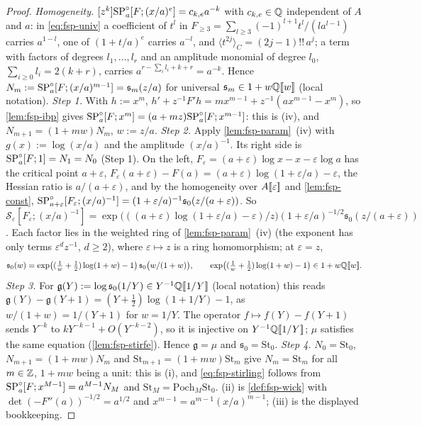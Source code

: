 \begin{proof}
\emph{Homogeneity.} $[z^k]\mathrm{SP}^{\circ}_a[F;(x/a)^e]=c_{k,e}a^{-k}$ with $c_{k,e}\in\mathbb{Q}$ independent of $A$ and $a$: in \eqref{eq:fsp-univ} a coefficient of $t^l$ in $F_{\geq3}=\sum_{l\geq3}(-1)^{l+1}t^l/(la^{l-1})$ carries $a^{1-l}$, one of $(1+t/a)^e$ carries $a^{-l}$, and $\langle t^{2j}\rangle_C=(2j-1)!!\,a^j$; a term with factors of degrees $l_1,\dots,l_r$ and an amplitude monomial of degree $l_0$, $\sum_{i\geq0}l_i=2(k+r)$, carries $a^{r-\sum_il_i+k+r}=a^{-k}$. Hence $N_m:=\mathrm{SP}^{\circ}_a[F;(x/a)^{m-1}]=\mathfrak s_m(z/a)$ for universal $\mathfrak s_m\in1+w\mathbb{Q}[\![ w ]\!]$ (local notation).
\emph{Step 1.} With $h:=x^m$, $h'+z^{-1}F'h=mx^{m-1}+z^{-1}(ax^{m-1}-x^m)$, so \cref{lem:fsp-ibp} gives $\mathrm{SP}^{\circ}_a[F;x^m]=(a+mz)\mathrm{SP}^{\circ}_a[F;x^{m-1}]$: this is (iv), and $N_{m+1}=(1+mw)N_m$, $w:=z/a$.
\emph{Step 2.} Apply \cref{lem:fsp-param}~(iv) with $g(x):=\log(x/a)$ and the amplitude $(x/a)^{-1}$. Its right side is $\mathrm{SP}^{\circ}_a[F;1]=N_1=N_0$ (Step 1). On the left, $F_\varepsilon=(a+\varepsilon)\log x-x-\varepsilon\log a$ has the critical point $a+\varepsilon$, $F_\varepsilon(a+\varepsilon)-F(a)=(a+\varepsilon)\log(1+\varepsilon/a)-\varepsilon$, the Hessian ratio is $a/(a+\varepsilon)$, and by the homogeneity over $A[\![ \varepsilon ]\!]$ and \cref{lem:fsp-const}, $\mathrm{SP}^{\circ}_{a+\varepsilon}[F_\varepsilon;(x/a)^{-1}]=(1+\varepsilon/a)^{-1}\mathfrak s_0(z/(a+\varepsilon))$. So
$\mathcal S_\varepsilon[F_\varepsilon;(x/a)^{-1}]=\exp\bigl(((a+\varepsilon)\log(1+\varepsilon/a)-\varepsilon)/z\bigr)(1+\varepsilon/a)^{-1/2}\mathfrak s_0(z/(a+\varepsilon))$. Each factor lies in the weighted ring of \cref{lem:fsp-param}~(iv) (the exponent has only terms $\varepsilon^dz^{-1}$, $d\geq2$), where $\varepsilon\mapsto z$ is a ring homomorphism; at $\varepsilon=z$,
\[
\mathfrak s_0(w)=\exp\bigl((\tfrac1w+\tfrac12)\log(1+w)-1\bigr)\,\mathfrak s_0\bigl(w/(1+w)\bigr),\qquad\exp\bigl((\tfrac1w+\tfrac12)\log(1+w)-1\bigr)\in1+w\mathbb{Q}[\![ w ]\!].
\]
\emph{Step 3.} For $\mathfrak g(Y):=\log\mathfrak s_0(1/Y)\in Y^{-1}\mathbb{Q}[\![ 1/Y ]\!]$ (local notation) this reads $\mathfrak g(Y)-\mathfrak g(Y+1)=(Y+\frac12)\log(1+1/Y)-1$, as $w/(1+w)=1/(Y+1)$ for $w=1/Y$. The operator $f\mapsto f(Y)-f(Y+1)$ sends $Y^{-k}$ to $kY^{-k-1}+O(Y^{-k-2})$, so it is injective on $Y^{-1}\mathbb{Q}[\![ 1/Y ]\!]$; $\mu$ satisfies the same equation (\cref{lem:fsp-stirfe}). Hence $\mathfrak g=\mu$ and $\mathfrak s_0=\mathrm{St}_0$.
\emph{Step 4.} $N_0=\mathrm{St}_0$, $N_{m+1}=(1+mw)N_m$ and $\mathrm{St}_{m+1}=(1+mw)\mathrm{St}_m$ give $N_m=\mathrm{St}_m$ for all $m\in\mathbb{Z}$, $1+mw$ being a unit: this is (i), and \eqref{eq:fsp-stirling} follows from $\mathrm{SP}^{\circ}_a[F;x^{M-1}]=a^{M-1}N_M$ and $\mathrm{St}_M=\mathrm{Poch}_M\mathrm{St}_0$. (ii) is \cref{def:fsp-wick} with $\det(-F''(a))^{-1/2}=a^{1/2}$ and $x^{m-1}=a^{m-1}(x/a)^{m-1}$; (iii) is the displayed bookkeeping.
\end{proof}

